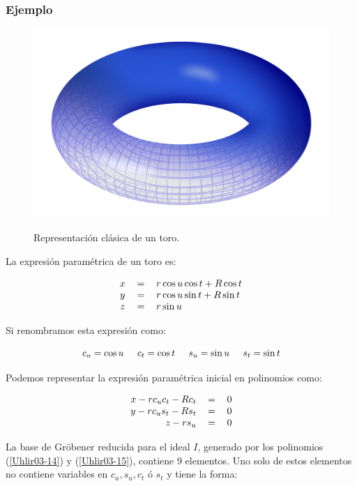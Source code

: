 \subsubsection*{Ejemplo}

\begin{figure}[h]
\centering
\includegraphics[width=0.5\linewidth]{images/Torus.png}
\caption{Representación clásica de un toro.}\cite{Wikipedia:Torus}
\end{figure}

La expresión paramétrica de un toro es:

\begin{equation}
\begin{tabular}{c c l}
$x$ & $=$ & $r \cos u \cos t + R \cos t$ \\
$y$ & $=$ & $r \cos u \sin t + R \sin t$ \\
$z$ & $=$ & $r \sin u$
\end{tabular}
\nonumber
\end{equation}

Si renombramos esta expresión como:

\begin{equation}\label{Uhlir03-14}
c_u = \cos u \hspace{0.5cm} c_t = \cos t \hspace{0.5cm} s_u = \sin u \hspace{0.5cm} s_t = \sin t
\end{equation}

Podemos representar la expresión paramétrica inicial en polinomios como:

\begin{equation}\label{Uhlir03-15}
\begin{tabular}{r c c}
$x - r c_u c_t - R c_t$ & $=$ & $0$ \\
$y - r c_u s_t - R s_t$ & $=$ & $0$ \\
$z - r s_u$ & $=$ & $0$
\end{tabular}
\end{equation}

La base de Gröbener reducida para el ideal $I$, generado por los polinomios (\ref{Uhlir03-14}) y (\ref{Uhlir03-15}), contiene 9 elementos. Uno solo de estos elementos no contiene variables en $c_u, s_u, c_t \text{ ó } s_t$ y tiene la forma:

